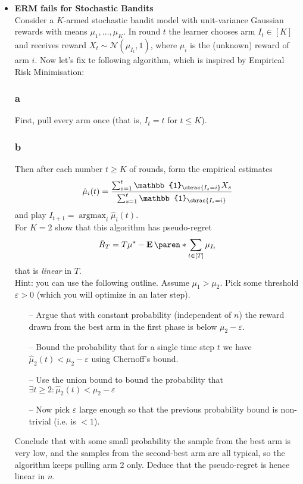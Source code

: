 \documentclass[10pt, a4paper, twoside]{amsart}
\theoremstyle{plain}
\DeclarePairedDelimiter\cbrac\{\}
\DeclarePairedDelimiter\paren()
\newcommand{\Ind}{\ensuremath{\mathbb{1}}}
\newcommand{\argmax}{\operatorname*{argmax}}
\newcommand{\Ev}{\operatorname*{\ensuremath{\mathbf{E}}}} %
\begin{document}
\begin{itemize}
    \item \textbf{ERM fails for Stochastic Bandits} \\
    Consider a $K$-armed stochastic bandit model with unit-variance Gaussian rewards with means $\mu_1,\ldots ,\mu_K$. In round $t$ the learner chooses arm $I_t \in [K]$ and receives reward $X_t \sim \mathcal{N}(\mu_{I_t}, 1)$, where $\mu_i$ is the (unknown) reward of arm $i$. Now let's fix te following algorithm, which is inspired by Empirical Risk Minimisation:
    \subsubsection*{a} First, pull every arm once (that is, $I_t = t$ for $t \leq K$).
    \subsubsection*{b} Then after each number $t \geq K$ of rounds, form the empirical estimates
    \begin{equation*}
        \hat{\mu}_i(t) = \frac{\sum_{s=1}^t \Ind_{\cbrac{I_s = i}} X_s}{\sum_{s=1}^t \Ind_{\cbrac{I_s =i}}}
    \end{equation*}
    and play $I_{t+1} = \argmax_i \hat{\mu}_i(t)$.\\
    For $K = 2$ show that this algorithm has pseudo-regret
    \begin{equation*}
        \bar{R}_T = T\mu^* - \Ev\paren*{\sum_{t \in [T]} \mu_{I_t}}
    \end{equation*}
    that is \textit{linear} in $T$.\\
    Hint: you can use the following outline. Assume $\mu_1 > \mu_2$. Pick some threshold $\varepsilon >0$ (which you will optimize in an later step).
    \begin{itemize}
        \item[--] Argue that with constant probability (independent of $n$) the reward drawn from the best arm in the first phase is below $\mu_2 - \varepsilon$.
        \item[--] Bound the probability that for a single time step $t$ we have $\hat{\mu}_2(t) < \mu_2 - \varepsilon$ using Chernoff's bound.
        \item[--] Use the union bound to bound the probability that $\exists t \geq 2 : \hat{\mu}_2(t) < \mu_2 - \varepsilon$
        \item[--] Now pick $\varepsilon$ large enough so that the previous probability bound is non-trivial (i.e. is $<1$).
    \end{itemize}
    Conclude that with some small probability the sample from the best arm is very low, and the samples from the second-best arm are all typical, so the algorithm keeps pulling arm 2 only. Deduce that the pseudo-regret is hence linear in $n$.
\end{itemize}
\end{document}

